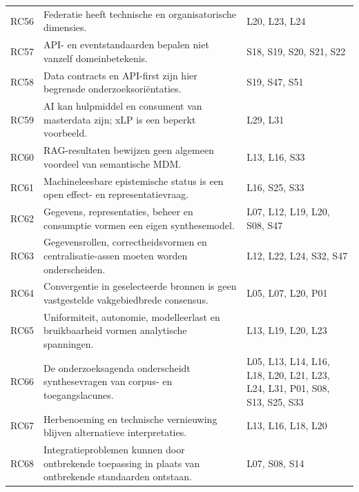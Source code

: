 \begin{longtable}{@{}P{.09\linewidth}P{.59\linewidth}P{.24\linewidth}@{}}
RC56 & Federatie heeft technische en organisatorische dimensies. & L20, L23, L24 \\
RC57 & API- en eventstandaarden bepalen niet vanzelf domeinbetekenis. & S18, S19, S20, S21, S22 \\
RC58 & Data contracts en API-first zijn hier begrensde onderzoeksoriëntaties. & S19, S47, S51 \\
RC59 & AI kan hulpmiddel en consument van masterdata zijn; xLP is een beperkt voorbeeld. & L29, L31 \\
RC60 & RAG-resultaten bewijzen geen algemeen voordeel van semantische MDM. & L13, L16, S33 \\
RC61 & Machineleesbare epistemische status is een open effect- en representatievraag. & L16, S25, S33 \\
RC62 & Gegevens, representaties, beheer en consumptie vormen een eigen synthesemodel. & L07, L12, L19, L20, S08, S47 \\
RC63 & Gegevensrollen, correctheidsvormen en centralisatie-assen moeten worden onderscheiden. & L12, L22, L24, S32, S47 \\
RC64 & Convergentie in geselecteerde bronnen is geen vastgestelde vakgebiedbrede consensus. & L05, L07, L20, P01 \\
RC65 & Uniformiteit, autonomie, modelleerlast en bruikbaarheid vormen analytische spanningen. & L13, L19, L20, L23 \\
RC66 & De onderzoeksagenda onderscheidt synthesevragen van corpus- en toegangslacunes. & L05, L13, L14, L16, L18, L20, L21, L23, L24, L31, P01, S08, S13, S25, S33 \\
RC67 & Herbenoeming en technische vernieuwing blijven alternatieve interpretaties. & L13, L16, L18, L20 \\
RC68 & Integratieproblemen kunnen door ontbrekende toepassing in plaats van ontbrekende standaarden ontstaan. & L07, S08, S14 \\
\bottomrule\end{longtable}\normalsize
